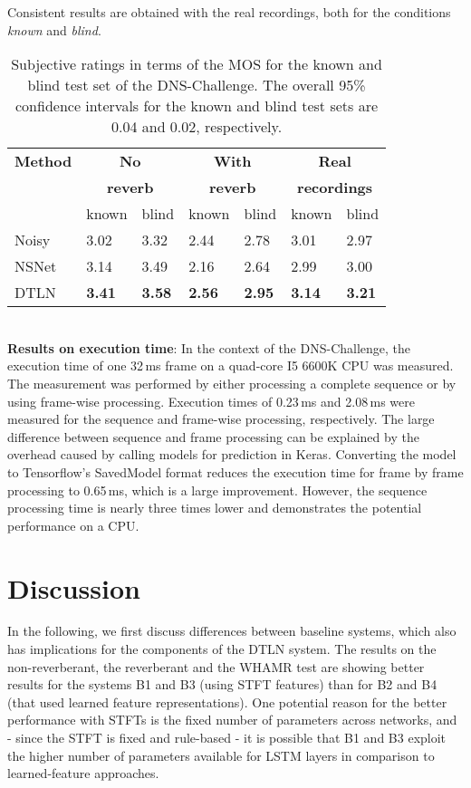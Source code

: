 \documentclass[a4paper]{article}
\begin{document}
Consistent results are obtained with the real recordings, both for the conditions \emph{known} and \emph{blind}.\begin{table}[th]
  
  \caption{Subjective ratings in terms of the MOS for the known and blind test set of the DNS-Challenge. The  overall 95\% confidence intervals for the known and blind test sets are 0.04 and 0.02, respectively.}
  \centering
  \begin{tabularx}{0.46\textwidth}{ X X X X X X X}
    \toprule
\textbf{Method} &  \multicolumn{2}{c}{\textbf{No}} & \multicolumn{2}{c}{\textbf{With}}   & \multicolumn{2}{c}{\textbf{Real}} 
        \\
       &  \multicolumn{2}{c}{\textbf{reverb}} & \multicolumn{2}{c}{\textbf{reverb}}   & \multicolumn{2}{c}{\textbf{recordings}} \\
       \midrule
     & known & blind	&	known & blind	&	known & blind	 \\
    \midrule
     Noisy & 3.02 & 3.32	&	2.44 & 2.78 	&	3.01 & 2.97		 \\ NSNet & 3.14 & 3.49	&	2.16 & 2.64	&	2.99 & 3.00		 \\ 

     DTLN & \textbf{3.41} & \textbf{3.58}	&	\textbf{2.56} & \textbf{2.95}	&	\textbf{3.14} & \textbf{3.21}		\\  

    \bottomrule
  \end{tabularx}
  \label{tab:mos_ver1}
\end{table}\\
\textbf{Results on execution time}: In the context of the DNS-Challenge, the execution time of one 32\,ms frame on a quad-core I5 6600K CPU was measured. The measurement was performed by either processing a complete sequence or by using frame-wise processing. 
Execution times of 0.23\,ms and 2.08\,ms were measured for the sequence and frame-wise processing, respectively. 
The large difference between sequence and frame processing can be explained by the overhead caused by calling models for prediction in Keras. Converting the model to Tensorflow's SavedModel format reduces the execution time for frame by frame processing to 0.65\,ms, which is a large improvement. However, the sequence processing time is nearly three times lower and demonstrates the potential performance on a CPU.
\section{Discussion}
In the following, we first discuss differences between baseline systems, which also has implications for the components of the DTLN system. 
The results on the non-reverberant, the reverberant and the WHAMR test are showing better results for the systems B1 and B3 (using STFT features) than for B2 and B4 (that used learned feature representations). 
One potential reason for the better performance with STFTs is the fixed number of parameters across networks, and - since the STFT is fixed and rule-based - it is possible that B1 and B3 exploit the higher number of parameters available for LSTM layers in comparison to learned-feature approaches. 
\end{document}
